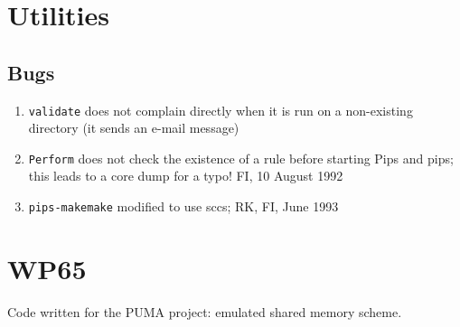 \section{Utilities}

\subsection{Bugs}

\begin{enumerate}

  \item \verb+validate+ does not complain directly 
        when it is run on a non-existing directory (it sends an e-mail message)

  \item \verb+Perform+ does not check the existence of a rule before
        starting Pips and pips; this leads to a core dump for a typo!
        FI, 10 August 1992

  \item \verb+pips-makemake+ modified to use sccs; RK, FI, June 1993

\end{enumerate}

\section{WP65}

Code written for the PUMA project: emulated shared memory scheme.


